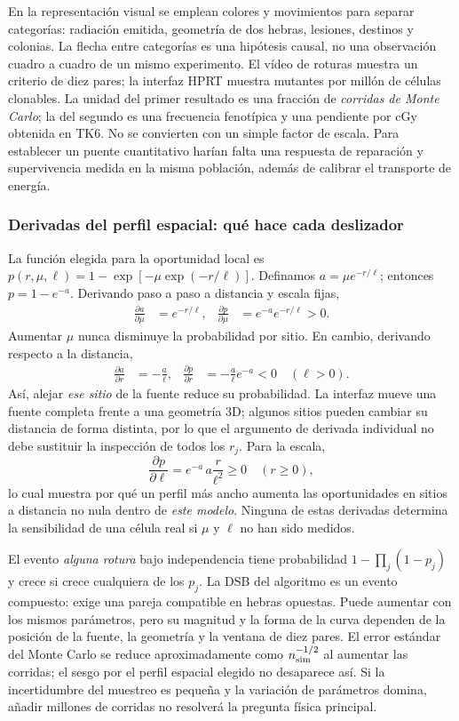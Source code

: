 En la representación visual se emplean colores y movimientos para
separar categorías: radiación emitida, geometría de dos hebras,
lesiones, destinos y colonias. La flecha entre categorías es una
hipótesis causal, no una observación cuadro a cuadro de un mismo
experimento. El vídeo de roturas muestra un criterio de diez pares;
la interfaz HPRT muestra mutantes por millón de células clonables.
La unidad del primer resultado es una fracción de \emph{corridas de
Monte Carlo}; la del segundo es una frecuencia fenotípica y una
pendiente por cGy obtenida en TK6. No se convierten con un simple
factor de escala. Para establecer un puente cuantitativo harían falta
una respuesta de reparación y supervivencia medida en la misma
población, además de calibrar el transporte de energía.

\subsubsection{Derivadas del perfil espacial: qué hace cada deslizador}
La función elegida para la oportunidad local es
$p(r,\mu,\ell)=1-\exp[-\mu\exp(-r/\ell)]$.
Definamos $a=\mu e^{-r/\ell}$; entonces $p=1-e^{-a}$.
Derivando paso a paso a distancia y escala fijas,
\begin{align}
\frac{\partial a}{\partial\mu}&=e^{-r/\ell},&
\frac{\partial p}{\partial\mu}
 &=e^{-a}e^{-r/\ell}>0.
\end{align}
Aumentar $\mu$ nunca disminuye la probabilidad por sitio. En cambio,
derivando respecto a la distancia,
\begin{align}
\frac{\partial a}{\partial r}&=-\frac{a}{\ell},&
\frac{\partial p}{\partial r}&=-\frac{a}{\ell}e^{-a}<0
\quad(\ell>0).
\end{align}
Así, alejar \emph{ese sitio} de la fuente reduce su probabilidad.
La interfaz mueve una fuente completa frente a una geometría 3D;
algunos sitios pueden cambiar su distancia de forma distinta, por lo
que el argumento de derivada individual no debe sustituir la
inspección de todos los $r_j$. Para la escala,
\[
\frac{\partial p}{\partial\ell}
=e^{-a}\,a\frac{r}{\ell^2}\geq0
\quad(r\geq0),
\]
lo cual muestra por qué un perfil más ancho aumenta las oportunidades
en sitios a distancia no nula dentro de \emph{este modelo}.
Ninguna de estas derivadas determina la sensibilidad de una célula
real si $\mu$ y $\ell$ no han sido medidos.

El evento \emph{alguna rotura} bajo independencia tiene probabilidad
$1-\prod_j(1-p_j)$ y crece si crece cualquiera de los $p_j$.
La DSB del algoritmo es un evento compuesto: exige una pareja
compatible en hebras opuestas. Puede aumentar con los mismos
parámetros, pero su magnitud y la forma de la curva dependen de la
posición de la fuente, la geometría y la ventana de diez pares.
El error estándar del Monte Carlo se reduce aproximadamente como
$n_{\rm sim}^{-1/2}$ al aumentar las corridas; el sesgo por el
perfil espacial elegido no desaparece así. Si la incertidumbre del
muestreo es pequeña y la variación de parámetros domina, añadir
millones de corridas no resolverá la pregunta física principal.

